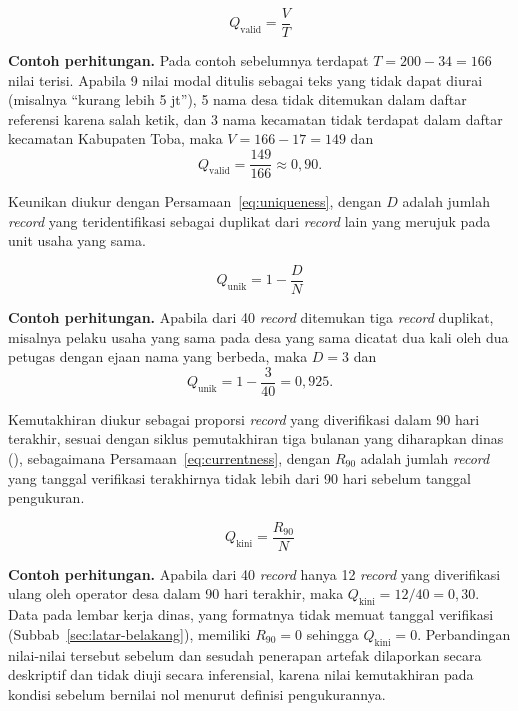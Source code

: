 \begin{equation}
  Q_{\text{valid}} = \frac{V}{T}
  \label{eq:validity}
\end{equation}

\noindent\textbf{Contoh perhitungan.} Pada contoh sebelumnya terdapat $T = 200 - 34 = 166$ nilai terisi. Apabila 9 nilai modal ditulis sebagai teks yang tidak dapat diurai (misalnya ``kurang lebih 5 jt''), 5 nama desa tidak ditemukan dalam daftar referensi karena salah ketik, dan 3 nama kecamatan tidak terdapat dalam daftar kecamatan Kabupaten Toba, maka $V = 166 - 17 = 149$ dan
\[
  Q_{\text{valid}} = \frac{149}{166} \approx 0{,}90.
\]

Keunikan diukur dengan Persamaan~\eqref{eq:uniqueness}, dengan $D$ adalah jumlah \textit{record} yang teridentifikasi sebagai duplikat dari \textit{record} lain yang merujuk pada unit usaha yang sama.

\begin{equation}
  Q_{\text{unik}} = 1 - \frac{D}{N}
  \label{eq:uniqueness}
\end{equation}

\noindent\textbf{Contoh perhitungan.} Apabila dari 40 \textit{record} ditemukan tiga \textit{record} duplikat, misalnya pelaku usaha yang sama pada desa yang sama dicatat dua kali oleh dua petugas dengan ejaan nama yang berbeda, maka $D = 3$ dan
\[
  Q_{\text{unik}} = 1 - \frac{3}{40} = 0{,}925.
\]

Kemutakhiran diukur sebagai proporsi \textit{record} yang diverifikasi dalam 90 hari terakhir, sesuai dengan siklus pemutakhiran tiga bulanan yang diharapkan dinas (\lampstaf), sebagaimana Persamaan~\eqref{eq:currentness}, dengan $R_{90}$ adalah jumlah \textit{record} yang tanggal verifikasi terakhirnya tidak lebih dari 90 hari sebelum tanggal pengukuran.

\begin{equation}
  Q_{\text{kini}} = \frac{R_{90}}{N}
  \label{eq:currentness}
\end{equation}

\noindent\textbf{Contoh perhitungan.} Apabila dari 40 \textit{record} hanya 12 \textit{record} yang diverifikasi ulang oleh operator desa dalam 90 hari terakhir, maka $Q_{\text{kini}} = 12/40 = 0{,}30$. Data pada lembar kerja dinas, yang formatnya tidak memuat tanggal verifikasi (Subbab~\ref{sec:latar-belakang}), memiliki $R_{90} = 0$ sehingga $Q_{\text{kini}} = 0$. Perbandingan nilai-nilai tersebut sebelum dan sesudah penerapan artefak dilaporkan secara deskriptif dan tidak diuji secara inferensial, karena nilai kemutakhiran pada kondisi sebelum bernilai nol menurut definisi pengukurannya.

